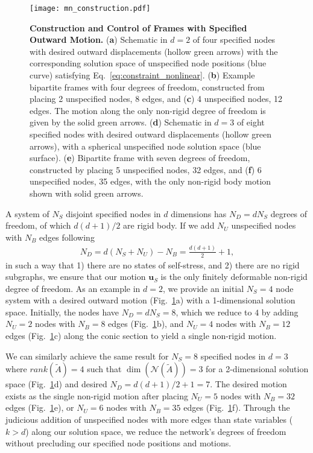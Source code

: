 \documentclass[%
preprint,
 amsmath,amssymb,
 aps,
]{revtex4-1}
\newcommand{\mc}{\mathcal}
\begin{document}
\begin{figure}[h!]
	\centering
	\texttt{[image: mn\_construction.pdf]}
	\caption{\textbf{Construction and Control of Frames with Specified Outward Motion.} (\textbf{a}) Schematic in $d = 2$ of four specified nodes with desired outward displacements (hollow green arrows) with the corresponding solution space of unspecified node positions (blue curve) satisfying Eq.~\ref{eq:constraint_nonlinear}. (\textbf{b}) Example bipartite frames with four degrees of freedom, constructed from placing 2 unspecified nodes, 8 edges, and (\textbf{c}) 4 unspecified nodes, 12 edges. The motion along the only non-rigid degree of freedom is given by the solid green arrows. (\textbf{d}) Schematic in $d=3$ of eight specified nodes with desired outward displacements (hollow green arrows), with a spherical unspecified node solution space (blue surface). (\textbf{e}) Bipartite frame with seven degrees of freedom, constructed by placing 5 unspecified nodes, 32 edges, and (\textbf{f}) 6 unspecified nodes, 35 edges, with the only non-rigid body motion shown with solid green arrows.}
	\label{fig:mn_construction}
\end{figure}

A system of $N_S$ disjoint specified nodes in $d$ dimensions has $N_D = dN_S$ degrees of freedom, of which $d(d+1)/2$ are rigid body. If we add $N_U$ unspecified nodes with $N_B$ edges following
\begin{align}
\label{eq:dof_bipartite}
N_D = d(N_S + N_U) - N_B = \frac{d(d+1)}{2}+1,
\end{align}
in such a way that 1) there are no states of self-stress, and 2) there are no rigid subgraphs, we ensure that our motion $\bm{u}_S$ is the only finitely deformable non-rigid degree of freedom. As an example in $d=2$, we provide an initial $N_S = 4$ node system with a desired outward motion (Fig.~\ref{fig:mn_construction}a) with a 1-dimensional solution space. Initially, the nodes have $N_D = dN_S = 8$, which we reduce to $4$ by adding $N_U = 2$ nodes with $N_B = 8$ edges (Fig.~\ref{fig:mn_construction}b), and $N_U = 4$ nodes with $N_B = 12$ edges (Fig.~\ref{fig:mn_construction}c) along the conic section to yield a single non-rigid motion. 

We can similarly achieve the same result for $N_S = 8$ specified nodes in $d = 3$ where $rank(\tilde{A}) = 4$ such that $\dim(\mc N(\tilde{A})) = 3$ for a 2-dimensional solution space (Fig.~\ref{fig:mn_construction}d) and desired $N_D = d(d+1)/2+1 = 7$. The desired motion exists as the single non-rigid motion after placing $N_U = 5$ nodes with $N_B = 32$ edges (Fig.~\ref{fig:mn_construction}e), or $N_U = 6$ nodes with $N_B = 35$ edges (Fig.~\ref{fig:mn_construction}f). Through the judicious addition of unspecified nodes with more edges than state variables ($k>d$) along our solution space, we reduce the network's degrees of freedom without precluding our specified node positions and motions.
\end{document}
